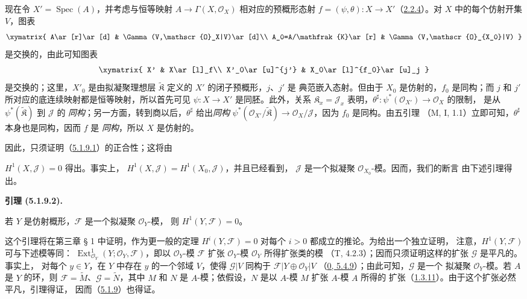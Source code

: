 \documentclass[UTF8,fontset=none,11pt,oneside,openany]{ctexbook}
\newenvironment{lemma}[1][]{%
  \par\medskip\noindent\textbf{引理 (#1).}\ %
}{\par}
\newcommand{\oldpage}[2][]{%
  \hypertarget{ega-source-page-#1-#2}{}%
  \marginnote{\scriptsize\textbf{#1}~|~#2}\ignorespaces}
\let\EGAOriginalLabel\label
\renewcommand{\label}[1]{\phantomsection\EGAOriginalLabel{#1}}
\begin{document}
现在令 $X'=\operatorname{Spec}(A)$，并考虑与恒等映射
$A\to\Gamma(X,\mathscr{O}_X)$ 相对应的预概形态射
$f=(\psi,\theta):X\to X'$（\hyperref[I.2.2.4-fr]{2.2.4}）。对 $X$
中的每个仿射开集 $V$，图表
\[
  \xymatrix{
    A\ar[r]\ar[d] & \Gamma(V,\mathscr{O}_X|V)\ar[d]\\
    A_0=A/\mathfrak{K}\ar[r] & \Gamma(V,\mathscr{O}_{X_0}|V)
  }
\]
是交换的，由此可知图表
\[
  \xymatrix{
    X' & X\ar[l]_f\\
    X'_0\ar[u]^{j'} & X_0\ar[l]^{f_0}\ar[u]_j
  }
\]
是交换的；这里，$X'_0$ 是由拟凝聚理想层
$\widetilde{\mathfrak{K}}$ 定义的 $X'$ 的闭子预概形，$j$、$j'$ 是
典范嵌入态射。但由于 $X_0$ 是仿射的，$f_0$ 是同构；而 $j$ 和 $j'$
所对应的底连续映射都是恒等映射，所以首先可见
$\psi:X\to X'$ 是同胚。此外，关系 $\mathfrak{K}_x=\mathscr{J}_x$
表明，$\theta^\sharp:\psi^*(\mathscr{O}_{X'})\to\mathscr{O}_X$ 的限制，
是从 $\psi^*(\widetilde{\mathfrak{K}})$ 到 $\mathscr{J}$ 的
\emph{同构}；另一方面，转到商以后，$\theta^\sharp$ 给出\emph{同构}
$\psi^*(\mathscr{O}_{X'}/\widetilde{\mathfrak{K}})
\to\mathscr{O}_X/\mathscr{J}$，因为 $f_0$ 是同构。由五引理
（M, I, 1.1）立即可知，$\theta^\sharp$ 本身也是同构，因而 $f$ 是
\emph{同构}，所以 $X$ 是仿射的。

因此，只须证明（\hyperref[I.5.1.9.1-fr]{5.1.9.1}）的正合性；这将由

\oldpage[I]{131}
$H^1(X,\mathscr{J})=0$ 得出。事实上，
$H^1(X,\mathscr{J})=H^1(X_0,\mathscr{J})$，并且已经看到，
$\mathscr{J}$ 是一个拟凝聚 $\mathscr{O}_{X_0}$-模。因而，我们的断言
由下述引理得出。

\begin{lemma}[5.1.9.2]
\label{I.5.1.9.2-fr}
若 $Y$ 是仿射概形，$\mathscr{F}$ 是一个拟凝聚 $\mathscr{O}_Y$-模，
则 $H^1(Y,\mathscr{F})=0$。
\end{lemma}

这个引理将在第三章 § 1 中证明，作为更一般的定理
$H^i(Y,\mathscr{F})=0$ 对每个 $i>0$ 都成立的推论。为给出一个独立证明，
注意，$H^1(Y,\mathscr{F})$ 可与下述模等同：
$\operatorname{Ext}^1_{\mathscr{O}_Y}
(Y;\mathscr{O}_Y,\mathscr{F})$，即以 $\mathscr{O}_Y$-模
$\mathscr{F}$ 扩张 $\mathscr{O}_Y$-模 $\mathscr{O}_Y$ 所得扩张类的模
（T, 4.2.3）；因而只须证明这样的扩张 $\mathscr{G}$ 是平凡的。事实上，
对每个 $y\in Y$，在 $Y$ 中存在 $y$ 的一个邻域 $V$，使得
$\mathscr{G}|V$ 同构于 $\mathscr{F}|Y\oplus\mathscr{O}_Y|V$
（\hyperref[0.5.4.9-fr]{0, 5.4.9}）；由此可知，$\mathscr{G}$ 是一个
拟凝聚 $\mathscr{O}_Y$-模。若 $A$ 是 $Y$ 的环，则
$\mathscr{F}=\widetilde{M}$、$\mathscr{G}=\widetilde{N}$，其中 $M$ 和
$N$ 是 $A$-模；依假设，$N$ 是以 $A$-模 $M$ 扩张 $A$-模 $A$ 所得的
扩张（\hyperref[I.1.3.11-fr]{1.3.11}）。由于这个扩张必然平凡，引理得证，
因而（\hyperref[I.5.1.9-fr]{5.1.9}）也得证。
\end{document}
